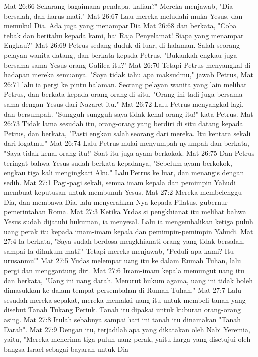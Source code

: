 Mat 26:66  Sekarang bagaimana pendapat kalian?" Mereka menjawab, "Dia bersalah, dan harus mati."
Mat 26:67  Lalu mereka meludahi muka Yesus, dan memukul Dia. Ada juga yang menampar Dia
Mat 26:68  dan berkata, "Coba tebak dan beritahu kepada kami, hai Raja Penyelamat! Siapa yang menampar Engkau?"
Mat 26:69  Petrus sedang duduk di luar, di halaman. Salah seorang pelayan wanita datang, dan berkata kepada Petrus, "Bukankah engkau juga bersama-sama Yesus orang Galilea itu?"
Mat 26:70  Tetapi Petrus menyangkal di hadapan mereka semuanya. "Saya tidak tahu apa maksudmu," jawab Petrus,
Mat 26:71  lalu ia pergi ke pintu halaman. Seorang pelayan wanita yang lain melihat Petrus, dan berkata kepada orang-orang di situ, "Orang ini tadi juga bersama-sama dengan Yesus dari Nazaret itu."
Mat 26:72  Lalu Petrus menyangkal lagi, dan bersumpah. "Sungguh-sungguh saya tidak kenal orang itu!" kata Petrus.
Mat 26:73  Tidak lama sesudah itu, orang-orang yang berdiri di situ datang kepada Petrus, dan berkata, "Pasti engkau salah seorang dari mereka. Itu kentara sekali dari logatmu."
Mat 26:74  Lalu Petrus mulai menyumpah-nyumpah dan berkata, "Saya tidak kenal orang itu!" Saat itu juga ayam berkokok.
Mat 26:75  Dan Petrus teringat bahwa Yesus sudah berkata kepadanya, "Sebelum ayam berkokok, engkau tiga kali mengingkari Aku." Lalu Petrus ke luar, dan menangis dengan sedih.
Mat 27:1  Pagi-pagi sekali, semua imam kepala dan pemimpin Yahudi membuat keputusan untuk membunuh Yesus.
Mat 27:2  Mereka membelenggu Dia, dan membawa Dia, lalu menyerahkan-Nya kepada Pilatus, gubernur pemerintahan Roma.
Mat 27:3  Ketika Yudas si pengkhianat itu melihat bahwa Yesus sudah dijatuhi hukuman, ia menyesal. Lalu ia mengembalikan ketiga puluh uang perak itu kepada imam-imam kepala dan pemimpin-pemimpin Yahudi.
Mat 27:4  Ia berkata, "Saya sudah berdosa mengkhianati orang yang tidak bersalah, sampai Ia dihukum mati!" Tetapi mereka menjawab, "Peduli apa kami? Itu urusanmu!"
Mat 27:5  Yudas melempar uang itu ke dalam Rumah Tuhan, lalu pergi dan menggantung diri.
Mat 27:6  Imam-imam kepala memungut uang itu dan berkata, "Uang ini uang darah. Menurut hukum agama, uang ini tidak boleh dimasukkan ke dalam tempat persembahan di Rumah Tuhan."
Mat 27:7  Lalu sesudah mereka sepakat, mereka memakai uang itu untuk membeli tanah yang disebut Tanah Tukang Periuk. Tanah itu dipakai untuk kuburan orang-orang asing.
Mat 27:8  Itulah sebabnya sampai hari ini tanah itu dinamakan "Tanah Darah".
Mat 27:9  Dengan itu, terjadilah apa yang dikatakan oleh Nabi Yeremia, yaitu, "Mereka menerima tiga puluh uang perak, yaitu harga yang disetujui oleh bangsa Israel sebagai bayaran untuk Dia.
